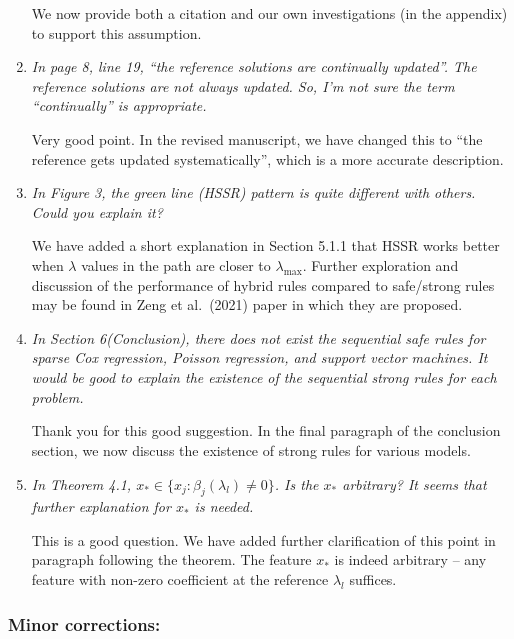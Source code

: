 \documentclass{article}
\begin{document}
\begin{enumerate}
  We now provide both a citation and our own investigations (in the appendix) to support this assumption.

\item \emph{In page 8, line 19, ``the reference solutions are continually updated''. The reference solutions are not always updated. So, I’m not sure the term ``continually'' is appropriate.}

  Very good point. In the revised manuscript, we have changed this to ``the reference gets updated systematically'', which is a more accurate description.

\item \emph{In Figure 3, the green line (HSSR) pattern is quite different with others. Could you explain it?}

  We have added a short explanation in Section 5.1.1 that HSSR works better when $\lambda$ values in the path are closer to $\lambda_{\max}$. Further exploration and discussion of the performance of hybrid rules compared to safe/strong rules may be found in Zeng et al.~(2021) paper in which they are proposed.

\item \emph{In Section 6(Conclusion), there does not exist the sequential safe rules for sparse Cox regression, Poisson regression, and support vector machines. It would be good to explain the existence of the sequential strong rules for each problem.}

  Thank you for this good suggestion. In the final paragraph of the conclusion section, we now discuss the existence of strong rules for various models.

\item \emph{In Theorem 4.1, $x_* \in \{ x_j : \hat{\beta}_j(\lambda_l) \ne 0 \}$. Is the $x_*$ arbitrary? It seems that further explanation for $x_*$ is needed.}

  This is a good question. We have added further clarification of this point in paragraph following the theorem. The feature $x_*$ is indeed arbitrary -- any feature with non-zero coefficient at the reference $\lambda_l$ suffices.

\end{enumerate}
 
\subsubsection*{Minor corrections:}
\end{document}
